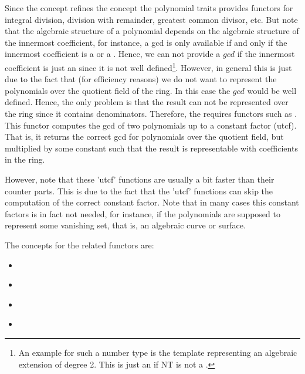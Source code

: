 Since the concept  refines the concept  the polynomial 
traits provides functors for integral division, division with remainder, greatest common divisor, etc.
But note that the algebraic structure of a polynomial depends on the algebraic structure of the innermost
coefficient, for instance, a gcd is only available if and only if the innermost coefficient is a  or 
a . Hence, we can not provide a $gcd$ if the innermost coefficient is just an
 since it is not well defined\footnote{%
An example for such a number type is the template  representing an 
algebraic extension of degree 2. This is just an  if NT is not a . }.
% 
However, in general this is just due to the fact that (for efficiency reasons) we do not want to represent 
the polynomials over the quotient field of the ring. In this case the $gcd$ would be well defined. 
Hence, the only problem is that the result can not be represented over the ring 
since it contains denominators.  
Therefore, the  requires functors such as 
. 
This functor computes the gcd of two polynomials up to a constant factor (utcf).  
That is, it returns the correct gcd for polynomials over the quotient field, 
but multiplied by some constant such that the result is representable with coefficients in the ring. 

However, note that these 'utcf' functions are usually a bit faster than their counter parts. 
This is due to the fact that the 'utcf' functions can skip the computation of the correct constant factor.
Note that in many cases this constant factors is in fact not needed, 
for instance, if the polynomials are supposed to represent some vanishing set, 
that is, an algebraic curve or surface.  

The concepts for the related functors are: 
\begin{itemize}
\item {}\\     

\item {}\\        

\item {}
      \\
       
\item {}\\
\end{itemize}

